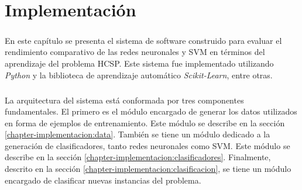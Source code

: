 \chapter{Implementación} \label{chapter-implementation}

\paragraph{} En este capítulo se presenta el sistema de software construido para evaluar el rendimiento comparativo de las redes neuronales y SVM en términos del aprendizaje del problema HCSP.
Este sistema fue implementado utilizando \textit{Python} y la biblioteca de aprendizaje automático \textit{Scikit-Learn}, entre otras.

\paragraph{} La arquitectura del sistema está conformada por tres componentes fundamentales.
El primero es el módulo encargado de generar los datos utilizados en forma de ejemplos de entrenamiento.
Este módulo se describe en la sección \ref{chapter-implementacion:data}.
También se tiene un módulo dedicado a la generación de clasificadores, tanto redes neuronales como SVM.
Este módulo se describe en la sección \ref{chapter-implementacion:clasificadores}.
Finalmente, descrito en la sección \ref{chapter-implementacion:clasificacion}, se tiene un módulo encargado de clasificar nuevas instancias del problema.






